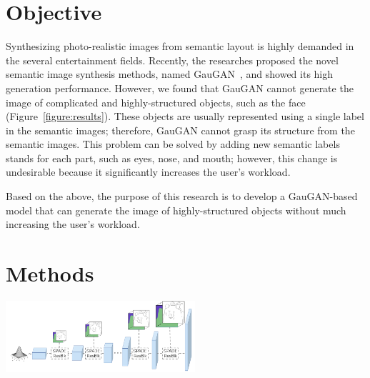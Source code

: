 \documentclass[a4paper]{article}
\newenvironment{Figure}
  {\par\medskip\noindent\minipage{\linewidth}}
  {\endminipage\par\medskip}
\newcommand{\aftersection}{\vspace{-5pt}}
\newcommand{\beforesection}{\vspace{-10pt}}
\newcommand{\beforecaption}{\vspace{-10pt}}
\begin{document}
\vspace{-25pt}
\begin{multicols}{2}
\section*{Objective}
\aftersection
Synthesizing photo-realistic images from semantic layout is highly demanded in the several entertainment fields. Recently, the researches proposed the novel semantic image synthesis methods, named GauGAN~\cite{spade}, and showed its high generation performance. However, we found that GauGAN cannot generate the image of complicated and highly-structured objects, such as the face (Figure~\ref{figure:results}). These objects are usually represented using a single label in the semantic images; therefore, GauGAN cannot grasp its structure from the semantic images. This problem can be solved by adding new semantic labels stands for each part, such as eyes, nose, and mouth; however, this change is undesirable because it significantly increases the user's workload.

Based on the above, the purpose of this research is to develop a GauGAN-based model that can generate the image of highly-structured objects without much increasing the user's workload.

\beforesection
\section*{Methods}

\vspace{-40pt}

\begin{Figure}
\begin{center}
\includegraphics[width=70mm]{trick.png}
\beforecaption
{}
\label{figure:trick}
\end{center}
\end{Figure}


\end{multicols}
\end{document}
